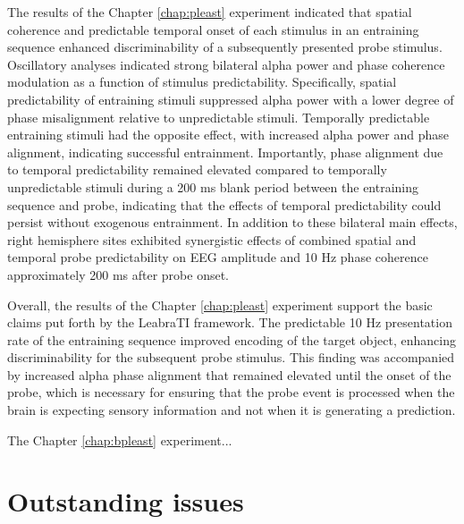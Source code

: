 \documentclass[dwyatte_dissertation.tex]{subfiles}
\begin{document}
The results of the Chapter \ref{chap:pleast} experiment indicated that spatial coherence and predictable temporal onset of each stimulus in an entraining sequence enhanced discriminability of a subsequently presented probe stimulus. Oscillatory analyses indicated strong bilateral alpha power and phase coherence modulation as a function of stimulus predictability. Specifically, spatial predictability of entraining stimuli suppressed alpha power with a lower degree of phase misalignment relative to unpredictable stimuli. Temporally predictable entraining stimuli had the opposite effect, with increased alpha power and phase alignment, indicating successful entrainment. Importantly, phase alignment due to temporal predictability remained elevated compared to temporally unpredictable stimuli during a 200 ms blank period between the entraining sequence and probe, indicating that the effects of temporal predictability could persist without exogenous entrainment. In addition to these bilateral main effects, right hemisphere sites exhibited synergistic effects of combined spatial and temporal probe predictability on EEG amplitude and 10 Hz phase coherence approximately 200 ms after probe onset. 

Overall, the results of the Chapter \ref{chap:pleast} experiment support the basic claims put forth by the LeabraTI framework. The predictable 10 Hz presentation rate of the entraining sequence improved encoding of the target object, enhancing discriminability for the subsequent probe stimulus. This finding was accompanied by increased alpha phase alignment that remained elevated until the onset of the probe, which is necessary for ensuring that the probe event is processed when the brain is expecting sensory information and not when it is generating a prediction. %

The Chapter \ref{chap:bpleast} experiment...

\section{Outstanding issues}
\end{document}
